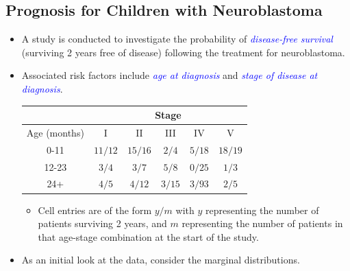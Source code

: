 \documentclass[oneside]{book}\usepackage[]{graphicx}\usepackage[svgnames]{xcolor}
\begin{document}
\subsection*{Prognosis for Children with Neuroblastoma}
\begin{itemize}
    \item A study is conducted to investigate the probability of \textcolor{Blue}{\emph{disease-free survival}}
          (surviving 2 years free of disease) following the treatment for neuroblastoma.
    \item Associated risk factors include \textcolor{Blue}{\emph{age at diagnosis}} and \textcolor{Blue}{\emph{stage of disease at diagnosis}}.
          \begin{table}
              \centering
              \begin{tabular}{cccccc}
                  \toprule
                               & \multicolumn{5}{c}{Stage}                                               \\
                  \midrule
                  Age (months) & I                         & II        & III      & IV       & V         \\
                  \midrule
                  0-11         & $ 11/12 $                 & $ 15/16 $ & $ 2/4 $  & $ 5/18 $ & $ 18/19 $ \\
                  12-23        & $ 3/4 $                   & $ 3/7 $   & $ 5/8 $  & $ 0/25 $ & $ 1/3 $   \\
                  24+          & $ 4/5 $                   & $ 4/12 $  & $ 3/15 $ & $ 3/93 $ & $ 2/5 $   \\
                  \bottomrule
              \end{tabular}
          \end{table}
          \begin{itemize}
              \item Cell entries are of the form $y/m$ with $y$ representing the number of patients surviving 2
                    years, and $m$ representing the number of patients in that age-stage combination at the
                    start of the study.
          \end{itemize}
    \item As an initial look at the data, consider the marginal distributions.
          \begin{table}[!htbp]
              \centering
              \begin{NiceTabular}{cccccc|c}
                  \toprule

\end{NiceTabular}
\end{table}
\end{itemize}
\end{document}
